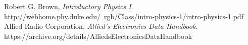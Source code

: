 %
%
%


\begin{thebibliography}{999}
{Robert G. Brown},
\emph{Introductory Physics I}.
http://webhome.phy.duke.edu/~rgb/Class/intro-physics-1/intro-physics-1.pdf
{Allied Radio Corporation},
\emph{Allied's Electronics Data Handbook}.
https://archive.org/details/AlliedsElectronicsDataHandbook

\end{thebibliography}

